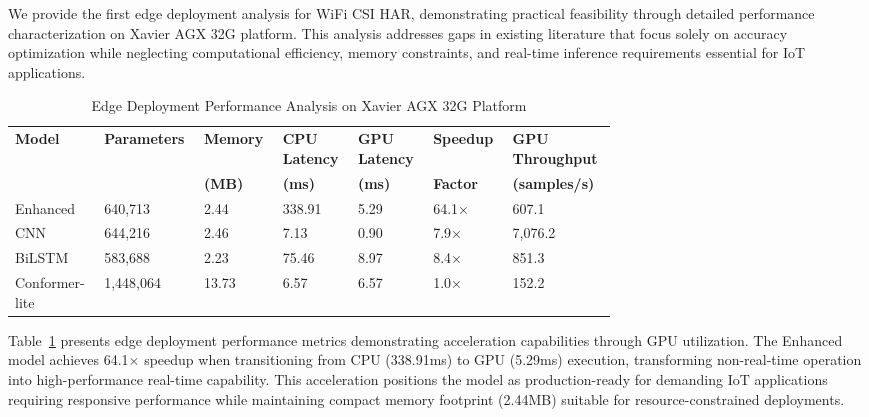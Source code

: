 \documentclass[journal]{IEEEtran}
\begin{document}
We provide the first edge deployment analysis for WiFi CSI HAR, demonstrating practical feasibility through detailed performance characterization on Xavier AGX 32G platform. This analysis addresses gaps in existing literature that focus solely on accuracy optimization while neglecting computational efficiency, memory constraints, and real-time inference requirements essential for IoT applications.

\begin{table}[ht]
\centering
\caption{Edge Deployment Performance Analysis on Xavier AGX 32G Platform}
\begin{tabular}{p{0.10\linewidth} p{0.10\linewidth} p{0.10\linewidth} p{0.10\linewidth} p{0.10\linewidth} p{0.10\linewidth} p{0.10\linewidth}}%
\toprule
\textbf{Model} & \textbf{Parameters} & \textbf{Memory} & \textbf{CPU Latency} & \textbf{GPU Latency} & \textbf{Speedup} & \textbf{GPU Throughput} \\
 & & \textbf{(MB)} & \textbf{(ms)} & \textbf{(ms)} & \textbf{Factor} & \textbf{(samples/s)} \\
\midrule
Enhanced & 640,713 & 2.44 & 338.91 & 5.29 & 64.1× & 607.1 \\
CNN & 644,216 & 2.46 & 7.13 & 0.90 & 7.9× & 7,076.2 \\
BiLSTM & 583,688 & 2.23 & 75.46 & 8.97 & 8.4× & 851.3 \\
Conformer-lite & 1,448,064 & 13.73 & 6.57 & 6.57 & 1.0× & 152.2 \\
\bottomrule
\end{tabular}
\label{tab:edge_performance}
\end{table}

Table~\ref{tab:edge_performance} presents edge deployment performance metrics demonstrating acceleration capabilities through GPU utilization. The Enhanced model achieves 64.1× speedup when transitioning from CPU (338.91ms) to GPU (5.29ms) execution, transforming non-real-time operation into high-performance real-time capability. This acceleration positions the model as production-ready for demanding IoT applications requiring responsive performance while maintaining compact memory footprint (2.44MB) suitable for resource-constrained deployments.
\end{document}
